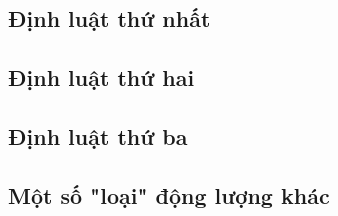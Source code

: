 \subsection{Định luật thứ nhất}
\subsection{Định luật thứ hai}
\subsection{Định luật thứ ba}
\subsection{Một số "loại" động lượng khác}